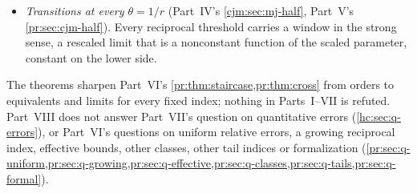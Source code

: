 \documentclass[11pt,a4paper]{article}
\theoremstyle{definition}\newaliascnt{definition}{theorem}
\theoremstyle{remark}\newaliascnt{remark}{theorem}
\begin{document}
\begin{itemize}
 converges to the density $I_p(\theta)^{-1}\prod x_i^{-3/2}$ on
 $\mathcal D_p(\theta)$, independently of an endpoint/gap channel uniform over
 $p+1$ values, with independent gap words (\cref{gc:cor:geometry}); in a
 reciprocal window the law is a two-family mixture with uniform-simplex
 deficits (\cref{gc:cor:mixture}). This answers Part~VII's question as posed
 and Part~VI's question \emph{partly}: the conditioned permutation has exactly
 $p$ macroscopic parser pieces with probability tending to one, but their
 positions in the permutation, their value sets beyond the parser's ordering
 and the location of the largest jump are not described.
\item \emph{Transitions at every $\theta=1/r$} (Part~IV's
 \cref{cjm:sec:mj-half}, Part~V's \cref{pr:sec:cjm-half}). Every reciprocal
 threshold carries a window in the strong sense, a rescaled limit that is a
 nonconstant function of the scaled parameter, constant on the lower side.
\end{itemize}
The theorems sharpen Part~VI's \cref{pr:thm:staircase,pr:thm:cross} from
orders to equivalents and limits for every fixed index; nothing in
Parts~I--VII is refuted. Part~VIII does not answer Part~VII's question on
quantitative errors (\cref{hc:sec:q-errors}), or Part~VI's questions on
uniform relative errors, a growing reciprocal index, effective bounds, other
classes, other tail indices or formalization
(\cref{pr:sec:q-uniform,pr:sec:q-growing,pr:sec:q-effective,pr:sec:q-classes,pr:sec:q-tails,pr:sec:q-formal}).
\end{document}
